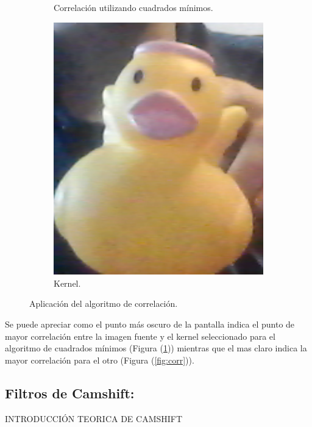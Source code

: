 \begin{figure}[H]
\begin{subfigure}{.4\textwidth}
		\caption{Correlación utilizando cuadrados mínimos.}
		\label{fig:sqdiff}
	\end{subfigure}
	\begin{subfigure}{.1\textwidth}
		\centering
		\includegraphics[width=1.2\textwidth]{Imagenes/kernel.png}
		\caption{Kernel.}
		\label{fig:kernel}
	\end{subfigure}
	\caption{Aplicación del algoritmo de correlación.}
	\label{fig:corrtest}
\end{figure}
Se puede apreciar como el punto más oscuro de la pantalla indica el punto de mayor correlación entre la imagen fuente y el kernel seleccionado para el algoritmo de cuadrados mínimos (Figura (\ref{fig:sqdiff})) mientras que el mas claro indica la mayor correlación para el otro (Figura (\ref{fig:corr})). 
\subsection{Filtros de Camshift:}
\begin{Huge}
INTRODUCCIÓN TEORICA DE CAMSHIFT
\end{Huge}
